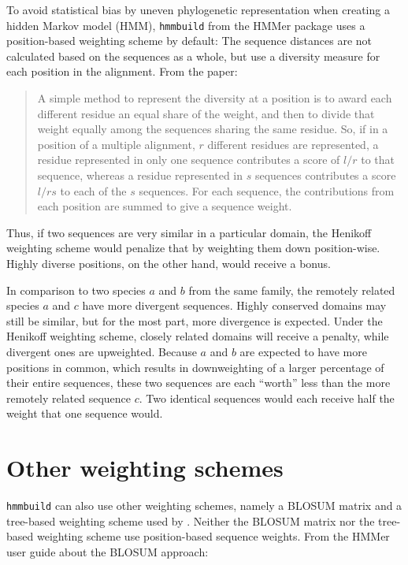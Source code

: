\label{sec:hmmtest}
To avoid statistical bias by uneven phylogenetic representation when creating a
hidden Markov model (HMM), \texttt{hmmbuild} from the HMMer package
\citep{eddy2009} uses a position-based weighting scheme \citep{henikoff1994}
by default: The sequence distances are not calculated based on the sequences as
a whole, but use a diversity measure for each position in the alignment. From
the paper:

\begin{quote}
	A simple method to represent the diversity at a position is to award each
	different residue an equal share of the weight, and then to divide that
	weight equally among the sequences sharing the same residue. So, if in a
	position of a multiple alignment, $r$ different residues are represented, a
	residue represented in only one sequence contributes a score of $l/r$ to that
	sequence, whereas a residue represented in $s$ sequences contributes a score
	$l/rs$ to each of the $s$ sequences. For each sequence, the contributions
	from each position are summed to give a sequence weight.
\end{quote}

Thus, if two sequences are very similar in a particular domain, the Henikoff
weighting scheme would penalize that by weighting them down position-wise.
Highly diverse positions, on the other hand, would receive a bonus. 

In comparison to two species $a$ and $b$ from the same family, the remotely
related species $a$ and $c$ have more divergent sequences. Highly conserved
domains may still be similar, but for the most part, more divergence is
expected. Under the Henikoff weighting scheme, closely related domains will
receive a penalty, while divergent ones are upweighted. Because $a$ and $b$ are
expected to have more positions in common, which results in downweighting of a
larger percentage of their entire sequences, these two sequences are each
``worth'' less than the more remotely related sequence $c$. Two identical
sequences would each receive half the weight that one sequence would.

\section*{Other weighting schemes}

\texttt{hmmbuild} can also use other weighting schemes, namely a BLOSUM matrix
and a tree-based weighting scheme used by \citet{gerstein1994}. Neither the
BLOSUM matrix nor the tree-based weighting scheme use position-based sequence
weights. From the HMMer user guide about the BLOSUM approach:

